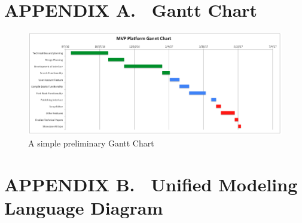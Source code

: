\documentclass[letterpaper, 10pt, draftclsnofoot, compsoc, onecolumn]{IEEEtran}
\begin{document}
{{{\section[APPENDIX A. \ Gantt Chart]{\rmfamily\bfseries\color{black}
APPENDIX A. \ Gantt Chart}

\bigskip



\begin{figure}[ht!]
\centering
\includegraphics[width=160mm]{gantt_chart.png}
\caption{A simple preliminary Gantt Chart}
\end{figure}

\clearpage\setcounter{page}{1}\pagestyle{Convertviii}
\section[APPENDIX B. \ UML Diagram]{\rmfamily\bfseries\color{black}
APPENDIX B. \ Unified Modeling Language Diagram}

\bigskip


}}}
\end{document}
